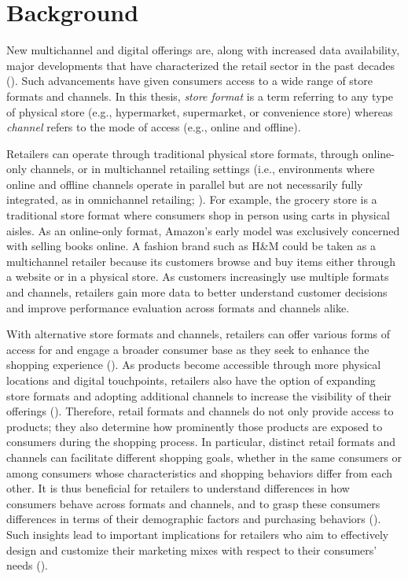 \section{Background}
\label{sec:background}
New multichannel and digital offerings are, along with increased data availability, major developments that have characterized the retail sector in the past decades (\cite{Bradlow2017-qf,Cui2021-rw,Dekimpe2020-bh,Verhoef2010-wh}). Such advancements have given consumers access to a wide range of store formats and channels. In this thesis, \textit{store format} is a term referring to any type of physical store (e.g., hypermarket, supermarket, or convenience store) whereas \textit{channel} refers to the mode of access (e.g., online and offline). 

Retailers can operate through traditional physical store formats, through online-only channels, or in multichannel retailing settings (i.e., environments where online and offline channels operate in parallel but are not necessarily fully integrated, as in omnichannel retailing; \cite{Verhoef2015-mq}). For example, the grocery store is a traditional store format where consumers shop in person using carts in physical aisles. As an online-only format, Amazon’s early model was exclusively concerned with selling books online. A fashion brand such as H\&M could be taken as a multichannel retailer because its customers browse and buy items either through a website or in a physical store. As customers increasingly use multiple formats and channels, retailers gain more data to better understand customer decisions and improve performance evaluation across formats and channels alike.

With alternative store formats and channels, retailers can offer various forms of access for and engage a broader consumer base as they seek to enhance the shopping experience (\cite{Verhoef2015-mq}). As products become accessible through more physical locations and digital touchpoints, retailers also have the option of expanding store formats and adopting additional channels to increase the visibility of their offerings (\cite{Lemon2016-gc}). Therefore, retail formats and channels do not only provide access to products; they also determine how prominently those products are exposed to consumers during the shopping process. In particular, distinct retail formats and channels can facilitate different shopping goals, whether in the same consumers or among consumers whose characteristics and shopping behaviors differ from each other. It is thus beneficial for retailers to understand differences in how consumers behave across formats and channels, and to grasp these consumers differences in terms of their demographic factors and purchasing behaviors (\cite{Verhoef2010-wh}). Such insights lead to important implications for retailers who aim to effectively design and customize their marketing mixes with respect to their consumers’ needs (\cite{Breugelmans2023-fh}).

